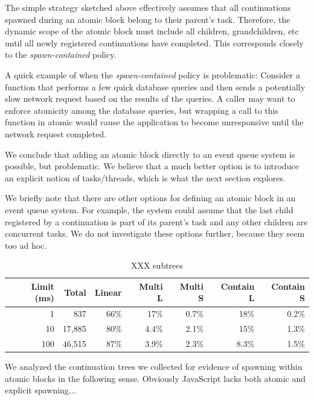 \documentclass[acmsmall,anonymous,review]{acmart}\settopmatter{printfolios=true,printccs=false,printacmref=false}
\begin{document}
The simple strategy sketched above effectively assumes that all continuations spawned during an atomic block belong to their parent's task.
Therefore, the dynamic scope of the atomic block must include all children, grandchildren, etc until all newly registered continuations have completed.
This corresponds closely to the \emph{spawn-contained} policy.

A quick example of when the \emph{spawn-contained} policy is problematic:
Consider a function that performs a few quick database queries and then sends a potentially slow network request based on the results of the queries.
A caller may want to enforce atomicity among the database queries, but wrapping a call to this function in atomic would cause the application to become unresponsive until the network request completed.

We conclude that adding an atomic block directly to an event queue system is possible, but problematic.
We believe that a much better option is to introduce an explicit notion of tasks/threads, which is what the next section explores.

We briefly note that there are other options for defining an atomic block in an event queue system.
For example, the system could assume that the last child registered by a continuation is part of its parent's task and any other children are concurrent tasks.
We do not investigate these options further, because they seem too ad hoc.

\begin{table}
  \centering
  \begin{tabular}{|r|r|r|r|r|r|r|}
    \hline
    Limit (ms) &  Total & Linear & Multi L & Multi S & Contain L & Contain S \\
    \hline
    1          &    837 &   66\% &    17\% &   0.7\% &      18\% &     0.2\% \\
    \hline
    10         & 17,885 &   80\% &   4.4\% &   2.1\% &      15\% &     1.3\% \\
    \hline
    100        & 46,515 &   87\% &   3.9\% &   2.3\% &     8.3\% &     1.5\% \\
    \hline
  \end{tabular}
  \caption{XXX subtrees}
  \label{table:subtrees}
\end{table}

We analyzed the continuation trees we collected for evidence of spawning within atomic blocks in the following sense.
Obviously JavaScript lacks both atomic and explicit spawning...
\end{document}
